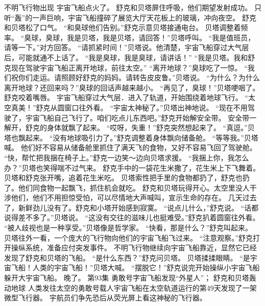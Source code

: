 \documentclass[a4paper,12pt,UTF8,twoside]{ctexbook}
\begin{document}
        不明飞行物出现   
        宇宙飞船点火了。 
        舒克和贝塔屏住呼吸，他们期望发射成功。 
        只听“轰”的一声巨响，宇宙飞船撞碎了展览大厅天花板上的玻璃，冲向夜空。 
        舒克和贝塔松了口气。 
        “和臭球他们告别。”舒克示意贝塔接通电台。 
        贝塔调整着频率。 
        “臭球，臭球，我是贝塔，我是贝塔，请回答！”贝塔呼叫。 
        “我是值班员，请等一下。”对方回答。 
        “请抓紧时间！”贝塔说。他清楚，宇宙飞船穿过大气层后，可能就通不上话了。 
        “我是臭球，我是臭球，请讲话！” 
        “我是贝塔。我和舒克现在驾驶宇宙飞船正离开地球，前往太空。” 
        “离开地球？”臭球吃了一惊。 
        “我们祝你们走运。请照顾好舒克的妈妈。请转告皮皮鲁。”贝塔说。 
        “为什么？为什么离开地球？还回来吗？”臭球的回话声越来越小。 
        “再见了，臭球！”贝塔哽咽了。 
        舒克咬着嘴唇。 
        宇宙飞船穿过大气层．进入了轨道，开始围绕着地球飞行。 
        “太空真美！”舒克从圆窗口往外看。 
        “宇宙太神秘了。”贝塔出神地说。 
        “现在不用驾驶了，宇宙飞船自己飞行了。咱们吃点儿东西吧。”舒克开始解安全带。 
        安全带一解开，舒克的身体就飘了起来。 
        “哎呀，失重！”舒克突然想起来了。 
        “真逗。”贝塔也飘起来。 
        “没有地球吸引力了。”舒克调整着身体飘向储备舱。 
        “等等我。”贝塔喊。 
        他们好不容易从储备舱里抓住了满天飞的食物，又好不容易飞回了驾驶舱。 
        “快，帮忙把我捆在椅子上。”舒克一边笑～边向贝塔求援。 
        “我捆上你，我怎么办？”贝塔也笑得喘不过气来。 
        舒克手中的一袋花生米撒了，花生米上下飞舞着。 
        贝塔和舒克张开嘴，追着花生米吃。 
        贝塔索性把手里的食物都扔了，舒克也扔了。他们同食物一起飘飞，抓住机会就吃。 
        舒克和贝塔玩得开心。太空里没人干涉他们，他们不用担惊受怕，可以尽情地大声喊叫，宣示生命的存在。 
        几天过去了，新鲜劲儿没有了。舒克和小塔开始感到寂寞。 
        “说点儿什么，”舒克说。 
        “话都说得差不多了。”贝塔说。 
        “这没有交往的滋味儿也挺难受。”舒克扒着圆窗往外看。 
        “被人歧视也是一种享受。”贝塔像是哲学家。 
        “快看，那是什么？”舒克叫起来。 
        贝塔往外一看，一个庞大的飞行物向他们的宇宙飞船飞过来。 
        “注意观察。”舒克打开操纵系统，准备应付突发事件。 
        不明飞行物继续向宇宙飞船靠近，显然它已经发现了舒克和贝塔的飞船。 
        “是什么东西？”舒克问贝塔。 
        贝塔揉揉眼睛。 
        “是宇宙飞船！人类的宇宙飞船！”贝塔大喊。 
        “摆脱它！”舒克说完开始操纵小宇宙飞船躲开大宇宙飞船。 
        晚了。   第93集 
        勇敢号字宙飞船发现“外星人”； 
        舒克和贝塔轰动地球   
        人类发往太空的勇敢号载人宇宙飞船在太空轨道运行的第49天发现了一架微型飞行器。 
        宇航员们争先恐后从荧光屏上看这神秘的飞行器。 
\end{document}
